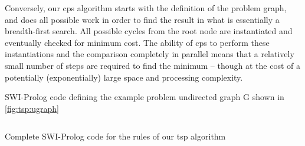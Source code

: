 Conversely, our \gls{cps} algorithm starts with the definition of the problem graph, and does all possible work in order to find the result in what is essentially a breadth-first search.  All possible cycles from the root node are instantiated and eventually checked for minimum cost. The ability of \gls{cps} to perform these instantiations and the comparison completely in parallel means that a relatively small number of steps are required to find the minimum -- though at the cost of a potentially (exponentially) large space and processing complexity.
\\
\begin{listing}
\caption{\label{app:tsp:probprolog}SWI-Prolog code defining the example problem undirected graph G shown in \autoref{fig:tsp:ugraph}}
\inputminted[linenos,breaklines,frame=lines,autogobble,lastline=3]{prolog}{chapters/tsp/code/tsp.pl.txt}
\end{listing}

\begin{listing}
\caption{\label{app:tsp:codeprolog}Complete SWI-Prolog code for the rules of our \gls{tsp} algorithm}
\inputminted[linenos,breaklines,frame=lines,autogobble,firstline=5]{prolog}{chapters/tsp/code/tsp.pl.txt}
\end{listing}